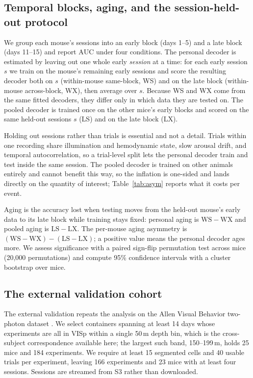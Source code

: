 \documentclass[mlabstract,onecolumn]{jmlr}
\newcommand{\auc}{\mathrm{AUC}}
\begin{document}
\subsection{Temporal blocks, aging, and the session-held-out protocol}
\label{sec:blocks}
We group each mouse's sessions into an early block (days 1--5)
and a late block (days 11--15) and report $\auc$ under four conditions. The personal decoder is
estimated by leaving out one whole early \emph{session} at a time: for each early session $s$ we
train on the mouse's remaining early sessions and score the resulting decoder both on $s$
(within-mouse same-block, WS) and on the late block (within-mouse across-block, WX), then average
over $s$. Because WS and WX come from the same fitted decoders, they differ only in which data they
are tested on. The pooled decoder is trained once on the other mice's early blocks and scored on the
same held-out sessions $s$ (LS) and on the late block (LX).

Holding out sessions rather than trials is essential and not a detail. Trials within one recording
share illumination and hemodynamic state, slow arousal drift, and temporal autocorrelation, so a
trial-level split lets the personal decoder train and test inside the same session. The pooled
decoder is trained on other animals entirely and cannot benefit this way, so the inflation is
one-sided and lands directly on the quantity of interest; Table~\ref{tab:asym} reports what it
costs per event.

Aging is the accuracy lost when testing moves from the held-out mouse's early data to its late block
while training stays fixed: personal aging is $\mathrm{WS}-\mathrm{WX}$ and pooled aging is
$\mathrm{LS}-\mathrm{LX}$. The per-mouse aging asymmetry is
$(\mathrm{WS}-\mathrm{WX})-(\mathrm{LS}-\mathrm{LX})$; a positive value means the personal decoder
ages more. We assess significance with a paired sign-flip permutation test across mice
(20{,}000 permutations) and compute 95\% confidence intervals with a cluster bootstrap over mice.

\subsection{The external validation cohort}
\label{sec:allencohort}
The external validation repeats the analysis on the Allen
Visual Behavior two-photon dataset \citep{allenvb2023}. We select containers spanning at least 14
days whose experiments are all in VISp within a single 50\,\textmu m depth bin, which is the
cross-subject correspondence available here; the largest such band, 150--199\,\textmu m, holds 25
mice and 184 experiments. We require at least 15 segmented cells and 40 usable trials per
experiment, leaving 166 experiments and 23 mice with at least four sessions. Sessions are streamed
from S3 rather than downloaded.
\end{document}
